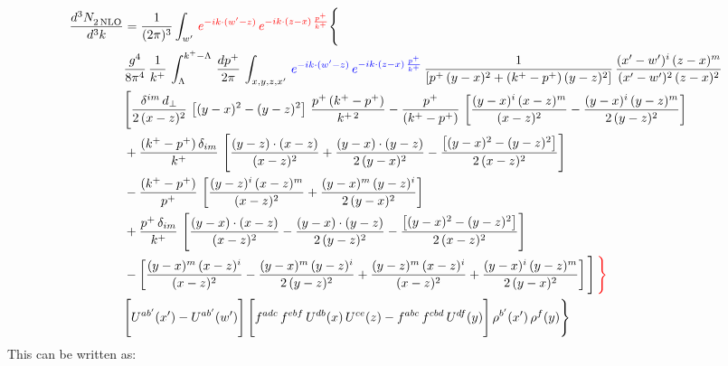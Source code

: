 \documentclass[9pt]{article}
\numberwithin{equation}{section}
\begin{document}
\begin{align}
    \frac{d^{3}N_{2\,\rm NLO}^{\rm}}{d^{3}k}  & =  \frac{1}{(2\pi)^{3}}  \int_{w^\prime}\, {\color{red}e^{-ik\cdot(w'-z)}\,e^{-ik\cdot (z-x)\,\frac{p^{+}}{k^{+}}}} \Bigg\{\notag \\ & \frac{g^{4}}{8\pi^{4}}\,\frac{1}{k^{+}}\,\int_{\Lambda}^{k^{+}-\Lambda}\, \frac{dp^{+}}{2\pi} \, \int_{x,y,z,x'}\,{\color{blue}e^{-ik\cdot(w'-z)}\,e^{-ik\cdot (z-x)\,\frac{p^{+}}{k^{+}}}}\,\frac{1}{\left[p^{+}\,(y-x)^{2}+(k^{+}-p^{+})\,(y-z)^{2}\right]}\, \frac{(x'-w')^{i}\,(z-x)^{m}}{(x'-w')^{2}\,(z-x)^{2}} \notag \\ & \Bigg[\frac{\delta^{im}\,d_{\perp}}{2\,(x-z)^{2}}\,\left[(y-x)^{2}-(y-z)^{2}\right]\,\frac{p^{+}\,(k^{+}-p^{+})}{k^{+\,2}}-\frac{p^{+}}{(k^{+}-p^{+})}\,\left[\frac{(y-x)^{i}\,(x-z)^{m}}{(x-z)^{2}}-\frac{(y-x)^{i}\,(y-z)^{m}}{2\,(y-z)^{2}}\right]\notag \\ & +\frac{(k^{+}-p^{+})\,\delta_{im}}{k^{+}}\,\left[\frac{(y-z)\cdot (x-z)}{(x-z)^{2}}+\frac{(y-x)\cdot (y-z)}{2\,(y-x)^{2}}-\frac{\left[(y-x)^{2}-(y-z)^{2}\right]}{2\,(x-z)^{2}}\right]\notag \\ & -\frac{(k^{+}-p^{+})}{p^{+}}\,\left[\frac{(y-z)^{i}\,(x-z)^{m}}{(x-z)^{2}}+\frac{(y-x)^{m}\,(y-z)^{i}}{2\,(y-x)^{2}}\right]\notag \\ & +\frac{p^{+}\,\delta_{im}}{k^{+}}\,\left[\frac{(y-x)\cdot (x-z)}{(x-z)^{2}}-\frac{(y-x)\cdot (y-z)}{2\,(y-z)^{2}}-\frac{\left[(y-x)^{2}-(y-z)^{2}\right]}{2\,(x-z)^{2}}\right]\notag \\ &-\left[\frac{(y-x)^{m}\,(x-z)^{i}}{(x-z)^{2}}-\frac{(y-x)^{m}\,(y-z)^{i}}{2\,(y-z)^{2}}+\frac{(y-z)^{m}\,(x-z)^{i}}{(x-z)^{2}}+\frac{(y-x)^{i}\,(y-z)^{m}}{2\,(y-x)^{2}}\right]\Bigg]\,{\color{red}\Bigg\}} \notag \\ & \Bigg[U^{ab'}(x')-U^{ab'}(w')\Bigg]\,\Bigg[f^{adc}\,f^{ebf}\,U^{db}(x)\,U^{ce}(z)-f^{abc}\,f^{cbd}\,U^{df}(y)\Bigg]\,\rho^{b'}(x')\,\rho^{f}(y)\Bigg\}
\end{align}
This can be written as: 
\end{document}
